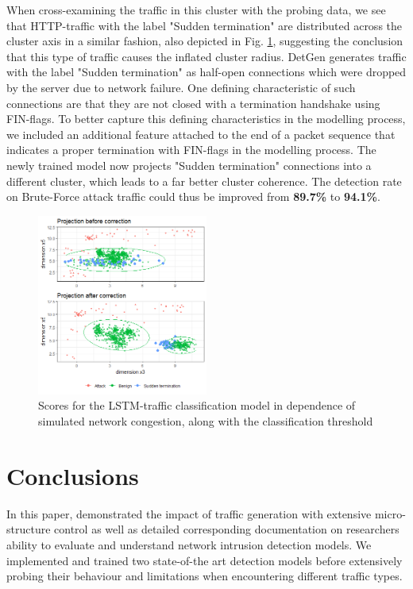 \documentclass[runningheads]{llncs}
\begin{document}
When cross-examining the traffic in this cluster with the probing data, we see that HTTP-traffic with the label "Sudden termination" are distributed across the cluster axis in a similar fashion, also depicted in Fig. \ref{fig:Subspace_projection}, suggesting the conclusion that this type of traffic causes the inflated cluster radius. DetGen generates traffic with the label "Sudden termination" as half-open connections which were dropped by the server due to network failure. One defining characteristic of such connections are that they are not closed with a termination handshake using FIN-flags. To better capture this defining characteristics in the modelling process, we included an additional feature attached to the end of a packet sequence that indicates a proper termination with FIN-flags in the modelling process.
The newly trained model now projects "Sudden termination" connections into a different cluster, which leads to a far better cluster coherence. The detection rate on Brute-Force attack traffic could thus be improved from \textbf{89.7\%} to \textbf{94.1\%}.

\begin{figure}
\centering
\includegraphics[width=0.5\textwidth]{images/Subspace_projection_new3.png}
\caption{Scores for the LSTM-traffic classification model in dependence of simulated network congestion, along with the classification threshold}\label{fig:Subspace_projection}
\end{figure}


\section{Conclusions}\label{Sec:Conclusion}

In this paper, demonstrated the impact of traffic generation with extensive micro-structure control as well as detailed corresponding documentation on researchers ability to evaluate and understand network intrusion detection models. We implemented and trained two state-of-the art detection models before extensively probing their behaviour and limitations when encountering different traffic types. 
\end{document}
